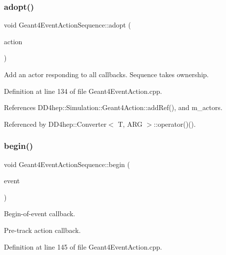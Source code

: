 \subsubsection{\texorpdfstring{adopt()}{adopt()}}
{\footnotesize\ttfamily void Geant4\+Event\+Action\+Sequence\+::adopt (\begin{DoxyParamCaption}\item[{\hyperlink{class_d_d4hep_1_1_simulation_1_1_geant4_event_action}{Geant4\+Event\+Action} $\ast$}]{action }\end{DoxyParamCaption})}



Add an actor responding to all callbacks. Sequence takes ownership. 



Definition at line 134 of file Geant4\+Event\+Action.\+cpp.



References D\+D4hep\+::\+Simulation\+::\+Geant4\+Action\+::add\+Ref(), and m\+\_\+actors.



Referenced by D\+D4hep\+::\+Converter$<$ T, A\+R\+G $>$\+::operator()().

\hypertarget{class_d_d4hep_1_1_simulation_1_1_geant4_event_action_sequence_a77375888d2519a2095ded294c540ebec}{}\label{class_d_d4hep_1_1_simulation_1_1_geant4_event_action_sequence_a77375888d2519a2095ded294c540ebec} 
\subsubsection{\texorpdfstring{begin()}{begin()}}
{\footnotesize\ttfamily void Geant4\+Event\+Action\+Sequence\+::begin (\begin{DoxyParamCaption}\item[{const G4\+Event $\ast$}]{event }\end{DoxyParamCaption})\hspace{0.3cm}{\ttfamily [virtual]}}



Begin-\/of-\/event callback. 

Pre-\/track action callback. 

Definition at line 145 of file Geant4\+Event\+Action.\+cpp.



